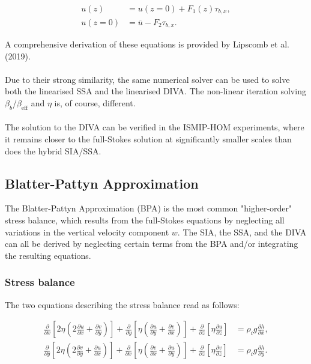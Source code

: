 \documentclass{article}
\begin{document}
\begin{align} \label{DIVA_04}
u \left( z \right) &= u \left( z = 0 \right) + F_1 \left( z \right) \tau_{b,x}, \\
u \left( z = 0 \right) &= \overline{u} - F_2 \tau_{b,x}.
\end{align}

A comprehensive derivation of these equations is provided by Lipscomb et al. (2019).\\
\\
Due to their strong similarity, the same numerical solver can be used to solve both the linearised SSA and the linearised DIVA. The non-linear iteration solving $\beta_b$/$\beta_{\textrm{eff}}$ and $\eta$ is, of course, different.\\
\\
The solution to the DIVA can be verified in the ISMIP-HOM experiments, where it remains closer to the full-Stokes solution at significantly smaller scales than does the hybrid SIA/SSA.

\subsection{Blatter-Pattyn Approximation}

The Blatter-Pattyn Approximation (BPA) is the most common "higher-order" stress balance, which results from the full-Stokes equations by neglecting all variations in the vertical velocity component $w$. The SIA, the SSA, and the DIVA can all be derived by neglecting certain terms from the BPA and/or integrating the resulting equations.

\subsubsection{Stress balance}

The two equations describing the stress balance read as follows:

\begin{align} \label{eq:BPA_01}
\frac{\partial}{\partial x} \left[ 2 \eta \left( 2 \frac{\partial u}{\partial x} + 
\frac{\partial v}{\partial y} \right) \right] + 
\frac{\partial}{\partial y} \left[ \eta \left( \frac{\partial u}{\partial y} + 
\frac{\partial v}{\partial x} \right) \right] + 
\frac{\partial}{\partial z} \left[ \eta \frac{\partial u}{\partial z} \right] &= \rho_i g \frac{\partial h}{\partial x}, \\
\frac{\partial}{\partial y} \left[ 2 \eta \left( 2 \frac{\partial v}{\partial y} + 
\frac{\partial u}{\partial x} \right) \right] + 
\frac{\partial}{\partial x} \left[ \eta \left( \frac{\partial v}{\partial x} + 
\frac{\partial u}{\partial y} \right) \right] + 
\frac{\partial}{\partial z} \left[ \eta \frac{\partial v}{\partial z} \right] &= \rho_i g \frac{\partial h}{\partial y}.
\end{align}
\end{document}
